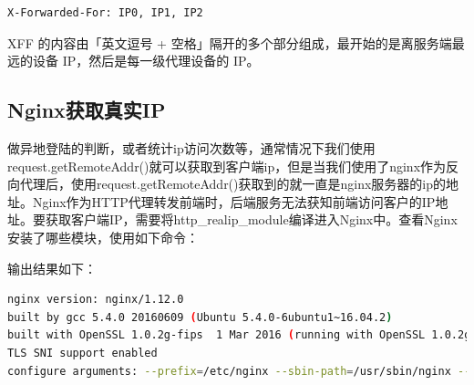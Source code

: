 \documentclass[letter]{book}
\begin{document}
\begin{lstlisting}[language=bash]
X-Forwarded-For: IP0, IP1, IP2
\end{lstlisting}

XFF 的内容由「英文逗号 + 空格」隔开的多个部分组成，最开始的是离服务端最远的设备 IP，然后是每一级代理设备的 IP。

\subsection{Nginx获取真实IP}

做异地登陆的判断，或者统计ip访问次数等，通常情况下我们使用request.getRemoteAddr()就可以获取到客户端ip，但是当我们使用了nginx作为反向代理后，使用request.getRemoteAddr()获取到的就一直是nginx服务器的ip的地址。Nginx作为HTTP代理转发前端时，后端服务无法获知前端访问客户的IP地址。要获取客户端IP，需要将http\_realip\_module编译进入Nginx中。查看Nginx安装了哪些模块，使用如下命令：



输出结果如下：

\begin{lstlisting}[language=bash]
nginx version: nginx/1.12.0
built by gcc 5.4.0 20160609 (Ubuntu 5.4.0-6ubuntu1~16.04.2) 
built with OpenSSL 1.0.2g-fips  1 Mar 2016 (running with OpenSSL 1.0.2g  1 Mar 2016)
TLS SNI support enabled
configure arguments: --prefix=/etc/nginx --sbin-path=/usr/sbin/nginx --modules-path=/usr/lib/nginx/modules --conf-path=/etc/nginx/nginx.conf --error-log-path=/var/log/nginx/error.log --http-log-path=/var/log/nginx/access.log --pid-path=/var/run/nginx.pid --lock-path=/var/run/nginx.lock --http-client-body-temp-path=/var/cache/nginx/client_temp --http-proxy-temp-path=/var/cache/nginx/proxy_temp --http-fastcgi-temp-path=/var/cache/nginx/fastcgi_temp --http-uwsgi-temp-path=/var/cache/nginx/uwsgi_temp --http-scgi-temp-path=/var/cache/nginx/scgi_temp --user=nginx --group=nginx --with-compat --with-file-aio --with-threads --with-http_addition_module --with-http_auth_request_module --with-http_dav_module --with-http_flv_module --with-http_gunzip_module --with-http_gzip_static_module --with-http_mp4_module --with-http_random_index_module --with-http_realip_module --with-http_secure_link_module --with-http_slice_module --with-http_ssl_module --with-http_stub_status_module --with-http_sub_module --with-http_v2_module --with-mail --with-mail_ssl_module --with-stream --with-stream_realip_module --with-stream_ssl_module --with-stream_ssl_preread_module --with-cc-opt='-g -O2 -fstack-protector-strong -Wformat -Werror=format-security -Wp,-D_FORTIFY_SOURCE=2 -fPIC' --with-ld-opt='-Wl,-Bsymbolic-functions -Wl,-z,relro -Wl,-z,now -Wl,--as-needed -pie'
\end{lstlisting}
\end{document}
